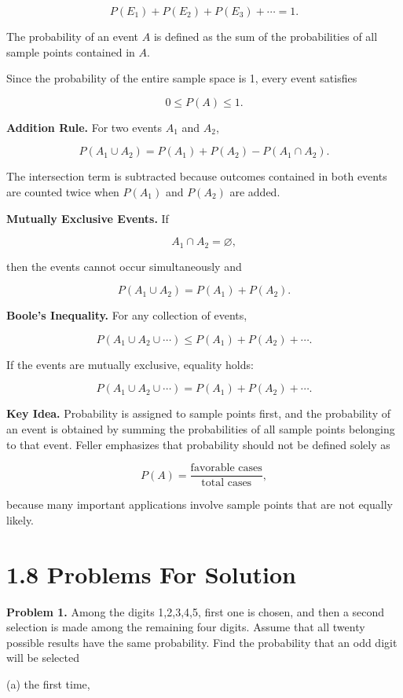 \documentclass[12pt]{article}
\begin{document}
\[
P(E_1)+P(E_2)+P(E_3)+\cdots = 1.
\tag{7.1}
\]

The probability of an event \(A\) is defined as the sum of the probabilities of all sample points contained in \(A\).

Since the probability of the entire sample space is 1, every event satisfies

\[
0 \le P(A) \le 1.
\tag{7.2}
\]

\textbf{Addition Rule.}
For two events \(A_1\) and \(A_2\),

\[
P(A_1 \cup A_2)
=
P(A_1)+P(A_2)-P(A_1\cap A_2).
\tag{7.4}
\]

The intersection term is subtracted because outcomes contained in both events are counted twice when \(P(A_1)\) and \(P(A_2)\) are added.

\textbf{Mutually Exclusive Events.}
If

\[
A_1\cap A_2=\varnothing,
\]

then the events cannot occur simultaneously and

\[
P(A_1\cup A_2)
=
P(A_1)+P(A_2).
\tag{7.5}
\]

\textbf{Boole's Inequality.}
For any collection of events,

\[
P(A_1\cup A_2\cup \cdots)
\le
P(A_1)+P(A_2)+\cdots.
\tag{7.6}
\]

If the events are mutually exclusive, equality holds:

\[
P(A_1\cup A_2\cup \cdots)
=
P(A_1)+P(A_2)+\cdots.
\tag{7.7}
\]

\textbf{Key Idea.}
Probability is assigned to sample points first, and the probability of an event is obtained by summing the probabilities of all sample points belonging to that event. Feller emphasizes that probability should not be defined solely as

\[
P(A)=\frac{\text{favorable cases}}{\text{total cases}},
\]

because many important applications involve sample points that are not equally likely.

\section*{1.8 Problems For Solution}
\textbf{Problem 1.} 
Among the digits 1,2,3,4,5, first one is chosen, and then a second selection is made among the remaining four digits. Assume that all twenty possible results have the same probability. Find the probability that an odd digit will be selected

(a) the first time,
\end{document}
